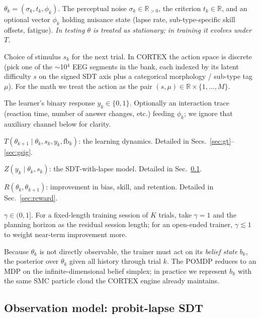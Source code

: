 \documentclass[11pt]{article}
\begin{document}
\begin{description}[leftmargin=2.2em,style=nextline,itemsep=2pt]
  \item[State $\mathcal{S}$.] $\theta_k = (\sigma_k, t_k, \phi_k)$.
    The perceptual noise $\sigma_k \in \mathbb{R}_{>0}$, the
    criterion $t_k \in \mathbb{R}$, and an optional vector $\phi_k$
    holding nuisance state (lapse rate, sub-type-specific skill
    offsets, fatigue). \emph{In testing $\theta$ is treated as
    stationary; in training it evolves under $T$.}
  \item[Action $\mathcal{A}$.] Choice of stimulus $s_k$ for the next
    trial. In CORTEX the action space is discrete (pick one of the
    $\sim$10$^4$ EEG segments in the bank, each indexed by its latent
    difficulty $s$ on the signed SDT axis plus a categorical
    morphology / sub-type tag $\mu$). For the math we treat the
    action as the pair $(s, \mu) \in \mathbb{R} \times
    \{1,\dots,M\}$.
  \item[Observation $\mathcal{O}$.] The learner's binary response
    $y_k \in \{0, 1\}$. Optionally an interaction trace
    (reaction time, number of answer changes, etc.) feeding $\phi_k$;
    we ignore that auxiliary channel below for clarity.
  \item[Transition kernel $T$.] $T(\theta_{k+1} \mid \theta_k, s_k,
    y_k, \mathrm{fb}_k)$: the learning dynamics. Detailed in
    Secs.~\ref{sec:gt}--\ref{sec:gsig}.
  \item[Observation kernel $Z$.] $Z(y_k \mid \theta_k, s_k)$: the
    SDT-with-lapse model. Detailed in Sec.~\ref{sec:obs}.
  \item[Reward $R$.] $R(\theta_k, \theta_{k+1})$: improvement in
    bias, skill, and retention. Detailed in
    Sec.~\ref{sec:reward}.
  \item[Discount $\gamma$.] $\gamma \in (0, 1]$. For a fixed-length
    training session of $K$ trials, take $\gamma = 1$ and the planning
    horizon as the residual session length; for an open-ended trainer,
    $\gamma \lesssim 1$ to weight near-term improvement more.
\end{description}

Because $\theta_k$ is not directly observable, the trainer must act
on its \emph{belief state} $b_k$, the posterior over $\theta_k$ given
all history through trial $k$. The POMDP reduces to an MDP on the
infinite-dimensional belief simplex; in practice we represent $b_k$
with the same SMC particle cloud the CORTEX engine already maintains.

\subsection{Observation model: probit-lapse SDT}
\label{sec:obs}
\end{document}

